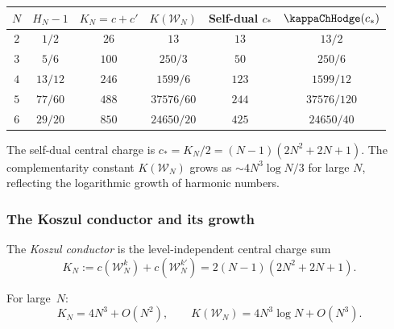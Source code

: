\begin{computation}
\renewcommand{\arraystretch}{1.4}
\begin{center}
\begin{tabular}{cccccc}
\toprule
$N$ & $H_N - 1$ & $K_N = c + c'$ & $K(\mathcal{W}_N)$ &
Self-dual $c_*$ & $\kappaChHodge(c_*)$ \\
\midrule
$2$ & $1/2$ & $26$ & $13$ & $13$ & $13/2$ \\[4pt]
$3$ & $5/6$ & $100$ & $250/3$ & $50$ & $250/6$ \\[4pt]
$4$ & $13/12$ & $246$ & $1599/6$ & $123$ & $1599/12$ \\[4pt]
$5$ & $77/60$ & $488$ & $37576/60$ & $244$ & $37576/120$ \\[4pt]
$6$ & $29/20$ & $850$ & $24650/20$ & $425$ & $24650/40$ \\
\bottomrule
\end{tabular}
\end{center}
The self-dual central charge is $c_* = K_N/2 = (N-1)(2N^2+2N+1)$.
The complementarity constant $K(\mathcal{W}_N)$ grows as
$\sim 4N^3 \log N / 3$ for large $N$, reflecting the logarithmic
growth of harmonic numbers.
\end{computation}

\subsubsection{The Koszul conductor and its growth}

\begin{definition}
The \emph{Koszul conductor} is the level-independent central charge sum
\begin{equation}%
K_N := c(\mathcal{W}_N^k) + c(\mathcal{W}_N^{k'})
= 2(N-1)(2N^2 + 2N + 1).
\end{equation}
\end{definition}

\begin{proposition}
For large~$N$:
\begin{equation}%
K_N = 4N^3 + O(N^2),
\qquad
K(\mathcal{W}_N) = 4N^3 \log N + O(N^3).
\end{equation}
\end{proposition}

